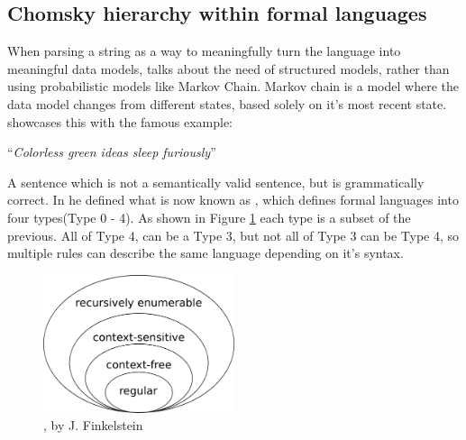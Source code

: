 \subsection{Chomsky hierarchy within formal languages}
When parsing a string as a way to meaningfully turn the language into meaningful data models, \cite{Chomsky} talks about the need of structured models, rather than using probabilistic models like Markov Chain. Markov chain is a model where the data model changes from different states, based solely on it's most recent state. \cite{Chomsky} showcases this with the famous example:

\vspace{12pt}
\centerline{``\emph{Colorless green ideas sleep furiously}''}
\vspace{12pt}

A sentence which is not a semantically valid sentence, but is grammatically correct. In \cite{Chomsky} he defined what is now known as \emph{\hierarchy{}}, which defines formal languages into four types(Type 0 - 4). As shown in Figure \ref{fig:Chomsky} each type is a subset of the previous. All of Type 4, can be a Type 3, but not all of Type 3 can be Type 4, so multiple rules can describe the same language depending on it's syntax.
\begin{figure}[ht!]
    \centerline{\includegraphics[width=0.5\textwidth]{img/Chomsky.png}}
    \caption{\hierarchy{}, by J. Finkelstein}
    \label{fig:Chomsky}
\end{figure}
\newpage
